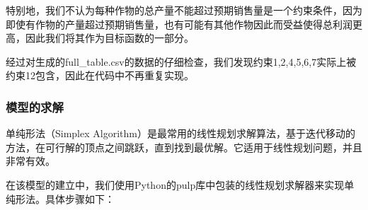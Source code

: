 \documentclass{cumcmthesis}
\begin{document}


特别地，我们不认为每种作物的总产量不能超过预期销售量是一个约束条件，因为即使有作物的产量超过预期销售量，也有可能有其他作物因此而受益使得总利润更高，因此我们将其作为目标函数的一部分。

经过对生成的full\_table.csv的数据的仔细检查，我们发现约束1,2,4,5,6,7实际上被约束12包含，因此在代码中不再重复实现。


\subsubsection{模型的求解}
单纯形法（Simplex Algorithm）是最常用的线性规划求解算法，基于迭代移动的方法，在可行解的顶点之间跳跃，直到找到最优解。它适用于线性规划问题，并且非常有效。

在该模型的建立中，我们使用Python的pulp库中包装的线性规划求解器来实现单纯形法。具体步骤如下：
\end{document}
